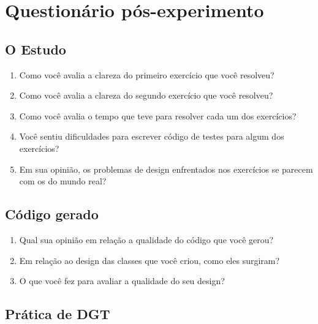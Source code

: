 \chapter{Questionário pós-experimento}
\label{ape:questionario-pos}

\section{O Estudo}

\begin{enumerate}

\item Como você avalia a clareza do primeiro exercício que você resolveu?	

\item Como você avalia a clareza do segundo exercício que você resolveu?	

\item Como você avalia o tempo que teve para resolver cada um dos exercícios?	

\item Você sentiu dificuldades para escrever código de testes para algum dos exercícios?	

\item Em sua opinião, os problemas de design enfrentados nos exercícios se parecem com os do mundo real?

\end{enumerate}

\section{Código gerado}

\begin{enumerate}
	
\item Qual sua opinião em relação a qualidade do código que você gerou?	

\item Em relação ao design das classes que você criou, como eles surgiram?

\item O que você fez para avaliar a qualidade do seu design?	

\end{enumerate}

\section{Prática de DGT}

